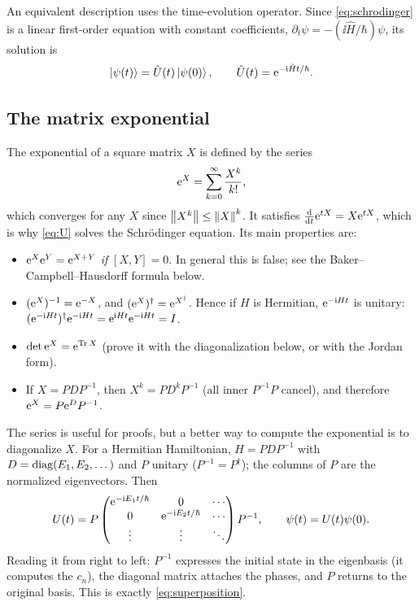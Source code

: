 An equivalent description uses the time-evolution operator. Since \cref{eq:schrodinger} is a linear first-order equation with constant
coefficients, $\partial_t\psi=-(\ii\hat H/\hbar)\psi$, its solution is
\begin{equation}\label{eq:U}
  \left|\psi(t)\right\rangle=\hat U(t)\left|\psi(0)\right\rangle,\qquad \hat U(t)=\mathrm e^{-\mathrm i\hat Ht/\hbar}.
\end{equation}

\subsection{The matrix exponential}
The exponential of a square matrix $X$ is defined by the series
\begin{equation}
  \mathrm e^X=\sum_{k=0}^\infty\frac{X^k}{k!},
\end{equation}
which converges for any $X$ since $\left\|X^k\right\|\le\left\|X\right\|^k$. It satisfies $\frac{\mathrm d}{\mathrm d t}\mathrm e^{tX}=X\mathrm e^{tX}$, which is why \cref{eq:U}
solves the Schrödinger equation. Its main properties are:
\begin{itemize}
  \item $\mathrm e^{X}\mathrm e^{Y}=\mathrm e^{X+Y}$ \emph{if} $[X,Y]=0$. In general this is false; see the Baker--Campbell--Hausdorff formula below.
  \item $(\mathrm e^X)^{-1}=\mathrm e^{-X}$, and $(\mathrm e^{X})^\dagger=\mathrm e^{X^\dagger}$. Hence if $H$ is Hermitian, $\mathrm e^{-\mathrm i Ht}$ is unitary:
  $(\mathrm e^{-\mathrm i Ht})^\dagger\mathrm e^{-\mathrm i Ht}=\mathrm e^{\mathrm i Ht}\mathrm e^{-\mathrm i Ht}=I$.
  \item $\det\mathrm e^X=\mathrm e^{\operatorname{Tr} X}$ (prove it with the diagonalization below, or with the Jordan form).
  \item If $X=PDP^{-1}$, then $X^k=PD^kP^{-1}$ (all inner $P^{-1}P$ cancel), and therefore $\mathrm e^X=P\mathrm e^DP^{-1}$.
\end{itemize}
The series is useful for proofs, but a better way to compute the exponential is to diagonalize $X$. For a Hermitian Hamiltonian,
$H=PDP^{-1}$ with $D=\operatorname{diag}(E_1,E_2,\dots)$ and $P$ unitary ($P^{-1}=P^\dagger$); the columns of $P$ are the normalized eigenvectors.
Then
\begin{equation}\label{eq:Udiag}
  U(t)=P\begin{pmatrix}\mathrm e^{-\mathrm i E_1t/\hbar}&0&\cdots\\0&\mathrm e^{-\mathrm i E_2t/\hbar}&\cdots\\ \vdots&\vdots&\ddots\end{pmatrix}P^{-1},
  \qquad \psi(t)=U(t)\psi(0).
\end{equation}
Reading it from right to left: $P^{-1}$ expresses the initial state in the eigenbasis (it computes the $c_n$), the diagonal matrix
attaches the phases, and $P$ returns to the original basis. This is exactly \cref{eq:superposition}.


